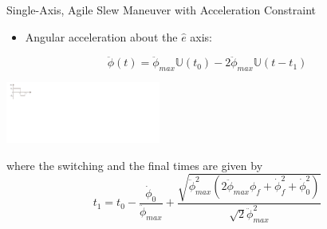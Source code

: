 \documentclass{beamer}
\begin{document}
%
\begin{frame}
\begin{block}{ Single-Axis, Agile Slew Maneuver with Acceleration Constraint}

\begin{itemize}
	\item Angular acceleration about the $\hat{e}$ axis:
\end{itemize}
\begin{equation}\label{alpha}
\ddot{\phi}(t)=\ddot{\phi}_{max}\mathbb{U}(t_0)- 2\ddot{\phi}_{max}\mathbb{U}(t-t_1)
\end{equation}

\begin{center}
\includegraphics[width=2in]{./Figures/Bang_bang}      
\end{center}

where the switching and the final times are given by
\begin{equation}
t_1=t_0-\frac{\dot{\phi}_{0}}{\ddot{\phi}_{max}}+\frac{\sqrt{\ddot{\phi}_{max}^2(2\ddot{\phi}_{max}\phi_{f}+\dot{\phi}_{f}^2+\dot{\phi}_{0}^2)}}{\sqrt{2}\ddot{\phi}_{max}^2}
\end{equation}


\end{block}
\end{frame}
\end{document}
